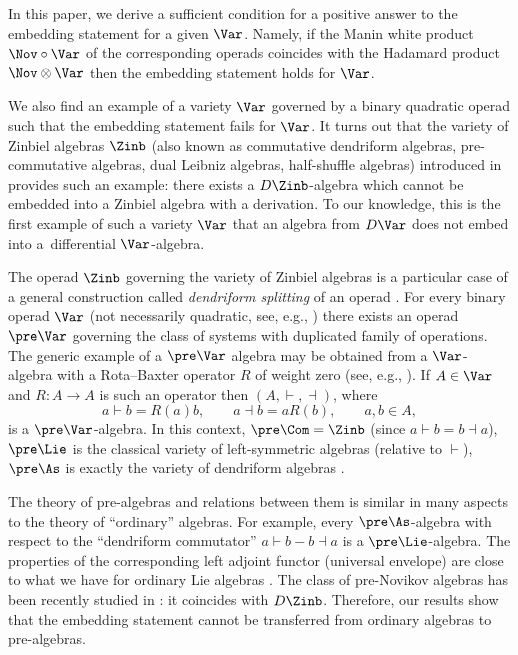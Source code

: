 In this paper, we derive a sufficient condition for a positive
answer to the embedding statement for a given $\Var $.
Namely, if the Manin white product $\Nov\circ \Var$ of the corresponding operads coincides with the Hadamard product
$\Nov\otimes \Var $ then the embedding statement holds for $\Var$.

We also find an example of a variety $\Var $ governed by
a binary quadratic operad such that the embedding
statement fails for $\Var$. It turns out that
the variety of Zinbiel algebras $\Zinb $ (also known as commutative dendriform algebras, pre-commutative algebras, dual Leibniz algebras, half-shuffle algebras) introduced in \cite{Loday} provides such an example:
there exists a $D\Zinb $-algebra which cannot be embedded into a Zinbiel algebra with a derivation.
To our knowledge, this is the first example of such a variety $\Var$ that an algebra from $D\Var$ does not embed into a~differential $\Var$-algebra.

The operad $\Zinb $ governing the variety of Zinbiel algebras
is a particular case of a general construction called {\em dendriform splitting} of an operad \cite{BBGN}.
For every binary operad $\Var $ (not necessarily quadratic,
see, e.g., \cite{GubKol2014}) there exists an operad
$\pre\Var $ governing the class of systems with duplicated
family of operations. The generic example of a $\pre\Var$ algebra may be obtained from a $\Var$-algebra
with a Rota--Baxter operator $R$ of weight zero
(see, e.g., \cite{LiGuo_RBABook}).
If $A\in \Var$ and $R\colon A\to A$ is such an operator then
$(A,\vdash, \dashv)$, where
\[
a\vdash b = R(a)b,\qquad a\dashv b = aR(b), \qquad a,b\in A,
\]
is a $\pre\Var $-algebra.
In this context,
$\pre\Com =\Zinb$ (since $a\vdash b = b\dashv a$),
$\pre\Lie$ is the classical variety of left-symmetric algebras (relative to $\vdash $), $\pre\As$ is exactly the variety of dendriform algebras \cite{Loday}.

The theory of pre-algebras and relations between them is similar
in many aspects to the theory of ``ordinary'' algebras.
For example, every $\pre\As $-algebra with respect to the ``dendriform commutator'' $a\vdash b - b\dashv a$ is a $\pre\Lie$-algebra. The properties of the corresponding left adjoint functor (universal envelope) are close to what we have
for ordinary Lie algebras
\cite{DotsTamaroff, Gubarev}.
The class of pre-Novikov algebras has been recently studied in \cite{Hong2023}: it coincides with $D\Zinb $.
Therefore, our results show that the embedding statement
cannot be transferred from ordinary algebras to pre-algebras.


